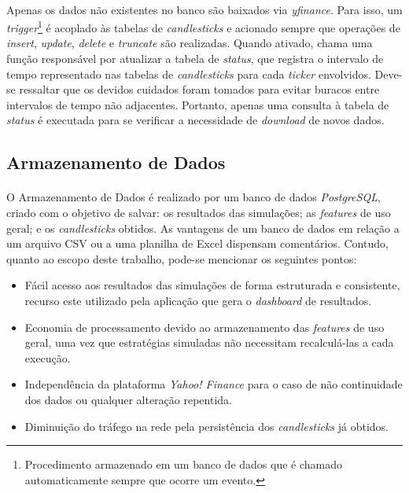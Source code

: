 \paragraph{} Apenas os dados não existentes no banco são baixados via \textit{yfinance}. Para isso, um \textit{trigger}\footnote{Procedimento armazenado em um banco de dados que é chamado automaticamente sempre que ocorre um evento.} é acoplado às tabelas de \textit{candlesticks} e acionado sempre que operações de \textit{insert}, \textit{update}, \textit{delete} e \textit{truncate} são realizadas. Quando ativado, chama uma função responsável por atualizar a tabela de \textit{status}, que registra o intervalo de tempo representado nas tabelas de \textit{candlesticks} para cada \textit{ticker} envolvidos. Deve-se ressaltar que os devidos cuidados foram tomados para evitar buracos entre intervalos de tempo não adjacentes. Portanto, apenas uma consulta à tabela de \textit{status} é executada para se verificar a necessidade de \textit{download} de novos dados.



\subsection{Armazenamento de Dados}

\paragraph{} O Armazenamento de Dados é realizado por um banco de dados \textit{PostgreSQL}, criado com o objetivo de salvar: os resultados das simulações; as \textit{features} de uso geral; e os \textit{candlesticks} obtidos. As vantagens de um banco de dados em relação a um arquivo CSV ou a uma planilha de Excel dispensam comentários. Contudo, quanto ao escopo deste trabalho, pode-se mencionar os seguintes pontos:

\begin{itemize}
    \item Fácil acesso aos resultados das simulações de forma estruturada e consistente, recurso este utilizado pela aplicação que gera o \textit{dashboard} de resultados.
    \item Economia de processamento devido ao armazenamento das \textit{features} de uso geral, uma vez que estratégias simuladas não necessitam recalculá-las a cada execução.
    \item Independência da plataforma \textit{Yahoo! Finance} para o caso de não continuidade dos dados ou qualquer alteração repentida.
    \item Diminuição do tráfego na rede pela persistência dos \textit{candlesticks} já obtidos.
\end{itemize}

